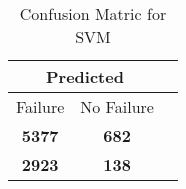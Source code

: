 \begin{table}[] 
\caption{Confusion Matric for SVM} 
\label{Table: Prediction Accuracy-DMDSVMOnlySunEKF-ignoreReflection100.9EKF-top2-Reflection} 
\centering 
\begin{tabular} 
 {@{}ccc@{}} 
\toprule 
\multicolumn{2}{c}{\textbf{Predicted}}
 \\ \midrule 
\multicolumn{1}{|c|}{Failure} & 
\multicolumn{1}{c|}{No Failure}
 \\ \midrule 
\multicolumn{1}{|c|}{\color{green}\textbf{5377}} & 
\multicolumn{1}{c|}{\color{green}\textbf{682}}
 \\ \midrule 
\multicolumn{1}{|c|}{\color{red}\textbf{2923}} & 
\multicolumn{1}{c|}{\color{red}\textbf{138}}
 \\ \bottomrule 
\end{tabular} 
\end{table} 
